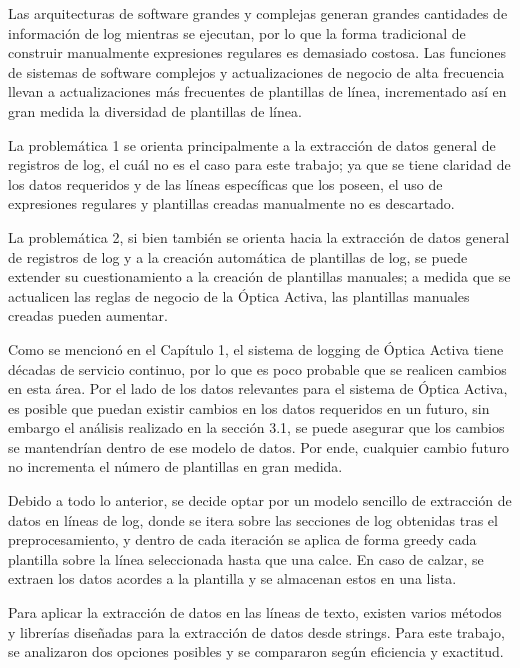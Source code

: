 Las arquitecturas de software grandes y complejas generan grandes cantidades de información de log mientras se ejecutan, por lo que la forma tradicional de construir manualmente expresiones regulares es demasiado costosa.
Las funciones de sistemas de software complejos y actualizaciones de negocio de alta frecuencia llevan a actualizaciones más frecuentes de plantillas de línea, incrementado así en gran medida la diversidad de plantillas de línea.

La problemática 1 se orienta principalmente a la extracción de datos general de registros de log, el cuál no es el caso para este trabajo; ya que se tiene claridad de los datos requeridos y de las líneas específicas que los poseen, el uso de expresiones regulares y plantillas creadas manualmente no es descartado.

La problemática 2, si bien también se orienta hacia la extracción de datos general de registros de log y a la creación automática de plantillas de log, se puede extender su cuestionamiento a la creación de plantillas manuales; a medida que se actualicen las reglas de negocio de la Óptica Activa, las plantillas manuales creadas pueden aumentar.

Como se mencionó en el Capítulo 1, el sistema de logging de Óptica Activa tiene décadas de servicio continuo, por lo que es poco probable que se realicen cambios en esta área. Por el lado de los datos relevantes para el sistema de Óptica Activa, es posible que puedan existir cambios en los datos requeridos en un futuro, sin embargo el análisis realizado en la sección 3.1, se puede asegurar que los cambios se mantendrían dentro de ese modelo de datos. Por ende, cualquier cambio futuro no incrementa el número de plantillas en gran medida.

Debido a todo lo anterior, se decide optar por un modelo sencillo de extracción de datos en líneas de log, donde se itera sobre las secciones de log obtenidas tras el preprocesamiento, y dentro de cada iteración se aplica de forma greedy cada plantilla sobre la línea seleccionada hasta que una calce. En caso de calzar, se extraen los datos acordes a la plantilla y se almacenan estos en una lista.

Para aplicar la extracción de datos en las líneas de texto, existen varios métodos y librerías diseñadas para la extracción de datos desde strings. Para este trabajo, se analizaron dos opciones posibles y se compararon según eficiencia y exactitud.

